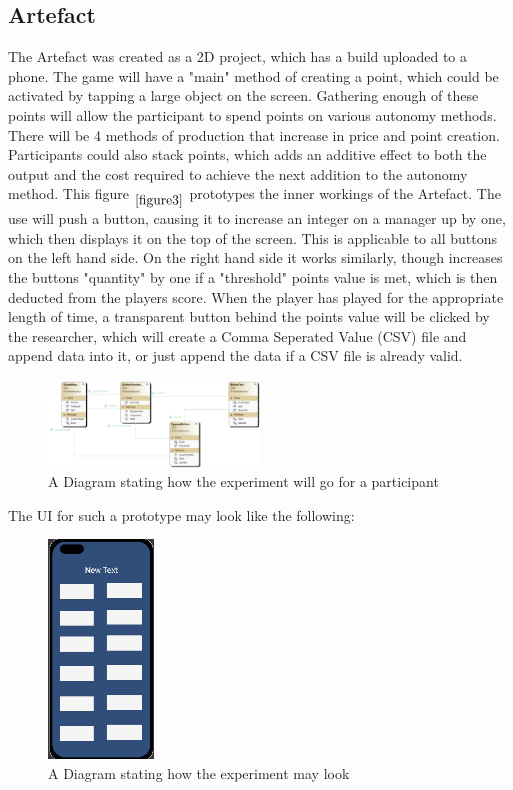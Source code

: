 \documentclass[conference]{IEEEtran}
\begin{document}
\subsection{Artefact}
The Artefact was created as a 2D project, which has a build uploaded to a phone. The game will have a "main" method of creating a point, which could be activated by tapping a large object on the screen. Gathering enough of these points will allow the participant to spend points on various autonomy methods. There will be 4 methods of production that increase in price and point creation. Participants could also stack points, which adds an additive effect to both the output and the cost required to achieve the next addition to the autonomy method. This figure $_{\ref{figure3}}$ prototypes the inner workings of the Artefact. The use will push a button, causing it to increase an integer on a manager up by one, which then displays it on the top of the screen. This is applicable to all buttons on the left hand side. On the right hand side it works similarly, though increases the buttons "quantity" by one if a "threshold" points value is met, which is then deducted from the players score. When the player has played for the appropriate length of time, a transparent button behind the points value will be clicked by the researcher, which will create a Comma Seperated Value (CSV) file and append data into it, or just append the data if a CSV file is already valid.\\

\begin{figure}[H]
\includegraphics[width = 0.5\textwidth]{UMLProcess}
\caption{A Diagram stating how the experiment will go for a participant}
\label{figure3}
\end{figure}
The UI for such a prototype may look like the following:

\begin{figure}[H]
\begin{center}
\includegraphics[width = 0.25\textwidth, ]{Sim1}
\caption{A Diagram stating how the experiment may look}
\label{figure1}
\end{center}
\end{figure}
\end{document}
